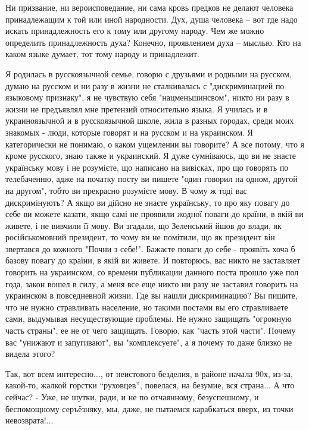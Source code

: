 \begin{itemize}

Ни призвание, ни вероисповедание, ни сама кровь предков не делают человека
принадлежащим к той или иной народности. Дух, душа человека – вот где надо
искать принадлежность его к тому или другому народу. Чем же можно определить
принадлежность духа? Конечно, проявлением духа – мыслью. Кто на каком языке
думает, тот тому народу и принадлежит.


Я родилась в русскоязычной семье, говорю с друзьями и родными на русском, думаю
на русском и ни разу в жизни не сталкивалась с "дискриминацией по языковому
признаку", я не чувствую себя "нацменьшинсвом", никто ни разу в жизни не
предъявлял мне претензий относительно языка. Я училась и в украиноязычной и в
русскоязычной школе, жила в разных городах, среди моих знакомых - люди, которые
говорят и на русском и на украинском. Я категорически не понимаю, о каком
ущемлении вы говорите? А все потому, что я кроме русского, знаю также и
украинский. Я дуже сумніваюсь, що ви не знаєте українську мову і не розумієте,
що написано на вивісках, про що говорять по телебаченню, адже на початку посту
ви пишете "один говорил на одном, другой на другом", тобто ви прекрасно
розумієте мову. В чому ж тоді вас дискримінують? А якщо ви дійсно не знаєте
українську, то про яку повагу до себе ви можете казати, якщо самі не проявили
жодної поваги до країни, в якій ви живете, і не вивчили її мову. Ви згадали, що
Зеленський йшов до влади, як російськомовний президент, то чому ви не помітили,
що як президент він звертався до кожного "Почни з себе!". Бажаєте поваги до
себе - проявіть хоча б базову повагу до країни, в якій ви живете. И повторюсь,
вас никто не заставляет говорить на украинском, со времени публикации данного
поста прошло уже пол года, закон вошел в силу, а меня все еще никто ни разу не
заставил говорить на украинском в повседневной жизни. Где вы нашли
дискриминацию? Вы пишите, что не нужно стравливать население, но такими постами
вы его стравливаете сами, выдумывая несуществующие проблемы. Не нужно защищать
"огромную часть страны", ее не от чего защищать. Говорю, как "часть этой
части". Почему вас "унижают и запугивают", вы "комплексуете", а я почему то
даже близко не видела этого?


Так, вот всем интересно..., от неистового безделия, в районе начала 90х, из-за,
какой-то, жалкой горстки \enquote{руховцев}, повелася, на безумие, вся страна...
А что сейчас?
- Уже, не шутки, ради, и не по отчаянному, безуспешному, и беспомощному серъёзняку, мы, даже, не пытаемся карабкаться вверх, из точки невозврата!...


\end{itemize}
